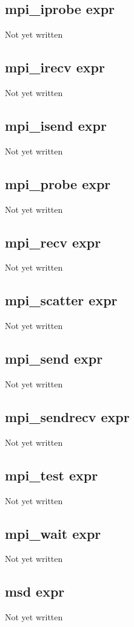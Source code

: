 \documentclass[a4paper,11pt]{article}
\begin{document}
\subsection{\ttfamily mpi\_iprobe expr}
Not yet written

\subsection{\ttfamily mpi\_irecv expr}
Not yet written

\subsection{\ttfamily mpi\_isend expr}
Not yet written

\subsection{\ttfamily mpi\_probe expr}
Not yet written

\subsection{\ttfamily mpi\_recv expr}
Not yet written

\subsection{\ttfamily mpi\_scatter expr}
Not yet written

\subsection{\ttfamily mpi\_send expr}
Not yet written

\subsection{\ttfamily mpi\_sendrecv expr}
Not yet written

\subsection{\ttfamily mpi\_test expr}
Not yet written

\subsection{\ttfamily mpi\_wait expr}
Not yet written

\subsection{\ttfamily msd expr}
Not yet written
\end{document}
